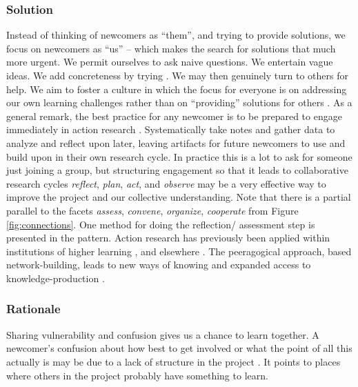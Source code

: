 \subsubsection*{Solution}

Instead of thinking of newcomers as ``them'', and trying to provide
solutions, we focus on newcomers as ``us'' -- which makes the search
for solutions that much more urgent.  We permit ourselves to ask naive
questions.  We entertain vague ideas.  We add concreteness by trying
.  We may then genuinely turn to
others for help.
We aim to foster a culture in which the focus for everyone is on
addressing our own learning challenges rather than on ``providing''
solutions for others \cite{boud2005peer}.
%
As a general remark, the best practice for any newcomer is to be
prepared to engage immediately in action research
\cite{lewin1946action}.  Systematically take notes and gather data to
analyze and reflect upon later, leaving artifacts for future newcomers
to use and build upon in their own research cycle.  In practice this is a
lot to ask for someone just joining a group, but structuring
engagement so that it leads to collaborative research cycles
\emph{reflect}, \emph{plan}, \emph{act}, and \emph{observe} may be a
very effective way to improve the project and our collective
understanding.
Note that there is a partial parallel to the facets \emph{assess},
\emph{convene}, \emph{organize}, \emph{cooperate} from Figure
\ref{fig:connections}.  One method for doing the reflection\slash
assessment step is presented in the  pattern.
Action research has previously been applied within institutions of
higher learning \cite{action-research-OU}, and elsewhere
\cite{trist1951some,bergold2012participatory}.
%
The peeragogical approach, based network-building,
leads to new ways of knowing and expanded access to
knowledge-production \cite{gilbert2012being,wagner2008new}.


%
\subsubsection*{Rationale} 
%
Sharing vulnerability and confusion gives us a chance to learn
together.  A newcomer's confusion about how best to get involved or
what the point of all this actually is may be due to a lack of
structure in the project .  It points to places
where others in the project probably have something to learn.
%

